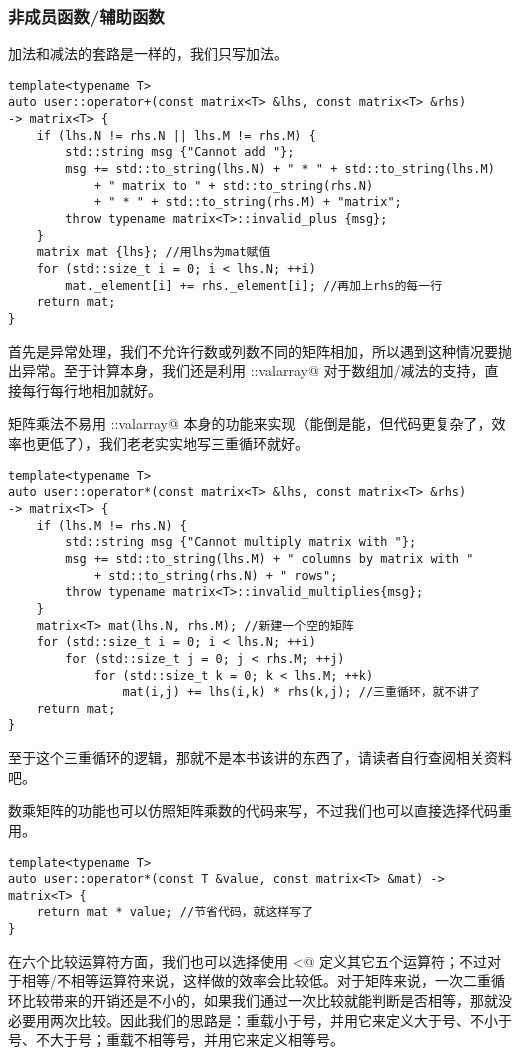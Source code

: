 \subsubsection*{非成员函数/辅助函数}
加法和减法的套路是一样的，我们只写加法。
\begin{lstlisting}
template<typename T>
auto user::operator+(const matrix<T> &lhs, const matrix<T> &rhs)
-> matrix<T> {
    if (lhs.N != rhs.N || lhs.M != rhs.M) {
        std::string msg {"Cannot add "};
        msg += std::to_string(lhs.N) + " * " + std::to_string(lhs.M)
            + " matrix to " + std::to_string(rhs.N)
            + " * " + std::to_string(rhs.M) + "matrix";
        throw typename matrix<T>::invalid_plus {msg};
    }
    matrix mat {lhs}; //用lhs为mat赋值
    for (std::size_t i = 0; i < lhs.N; ++i)
        mat._element[i] += rhs._element[i]; //再加上rhs的每一行
    return mat;
}
\end{lstlisting}
首先是异常处理，我们不允许行数或列数不同的矩阵相加，所以遇到这种情况要抛出异常。至于计算本身，我们还是利用 \lstinline@std::valarray@ 对于数组加/减法的支持，直接每行每行地相加就好。\par
矩阵乘法不易用 \lstinline@std::valarray@ 本身的功能来实现（能倒是能，但代码更复杂了，效率也更低了），我们老老实实地写三重循环就好。
\begin{lstlisting}
template<typename T>
auto user::operator*(const matrix<T> &lhs, const matrix<T> &rhs)
-> matrix<T> {
    if (lhs.M != rhs.N) {
        std::string msg {"Cannot multiply matrix with "};
        msg += std::to_string(lhs.M) + " columns by matrix with "
            + std::to_string(rhs.N) + " rows";
        throw typename matrix<T>::invalid_multiplies{msg};
    }
    matrix<T> mat(lhs.N, rhs.M); //新建一个空的矩阵
    for (std::size_t i = 0; i < lhs.N; ++i)
        for (std::size_t j = 0; j < rhs.M; ++j)
            for (std::size_t k = 0; k < lhs.M; ++k)
                mat(i,j) += lhs(i,k) * rhs(k,j); //三重循环，就不讲了
    return mat;
}
\end{lstlisting}
至于这个三重循环的逻辑，那就不是本书该讲的东西了，请读者自行查阅相关资料吧。\par
数乘矩阵的功能也可以仿照矩阵乘数的代码来写，不过我们也可以直接选择代码重用。
\begin{lstlisting}
template<typename T>
auto user::operator*(const T &value, const matrix<T> &mat) -> matrix<T> {
    return mat * value; //节省代码，就这样写了
}
\end{lstlisting}
在六个比较运算符方面，我们也可以选择使用 \lstinline@<@ 定义其它五个运算符；不过对于相等/不相等运算符来说，这样做的效率会比较低。对于矩阵来说，一次二重循环比较带来的开销还是不小的，如果我们通过一次比较就能判断是否相等，那就没必要用两次比较。因此我们的思路是：重载小于号，并用它来定义大于号、不小于号、不大于号；重载不相等号，并用它来定义相等号。
